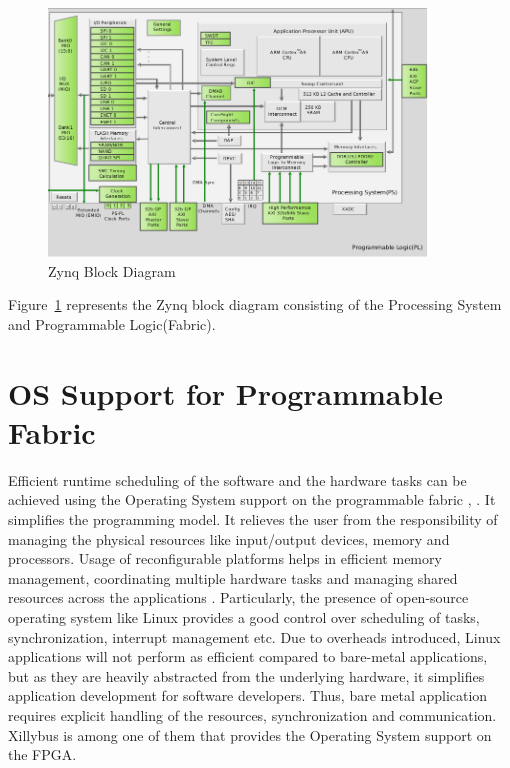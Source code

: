 \begin{figure}
	\centering
	\includegraphics[width=0.9\textwidth]{images/zynqblockdiagram.png}
	\caption{Zynq Block Diagram\cite{13}}
	\label{zynq:blk}
\end{figure}


Figure~\ref{zynq:blk} represents the Zynq block diagram consisting of the Processing System and Programmable Logic(Fabric).

\section{OS Support for Programmable Fabric}
Efficient runtime scheduling of the software and the hardware tasks can be achieved using the Operating System support on the programmable fabric \cite{14}, \cite{15}. It simplifies the programming model. It relieves the user from the responsibility of managing the physical resources like input/output devices, memory and processors. Usage of reconfigurable platforms helps in efficient memory management, coordinating multiple hardware tasks and managing shared resources across the applications \cite{16}. Particularly, the presence of open-source operating system like Linux provides a good control over scheduling of tasks, synchronization, interrupt management etc. Due to overheads introduced, Linux applications will not perform as efficient compared to bare-metal applications, but as they are heavily abstracted from the underlying hardware, it simplifies application development for software developers. Thus, bare metal application requires explicit handling of the resources, synchronization and communication. Xillybus \cite{17} is among one of them that provides the Operating System support on the FPGA.

